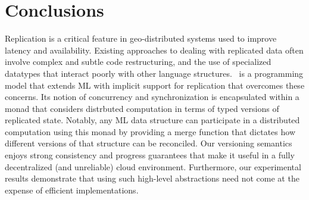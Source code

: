 \section{Conclusions}
\label{sec:conclusions}

Replication is a critical feature in geo-distributed systems used to
improve latency and availability.  Existing approaches to dealing with
replicated data often involve complex and subtle code restructuring,
and the use of specialized datatypes that interact poorly with other
language structures.  \name\ is a programming model that extends ML
with implicit support for replication that overcomes these concerns.
Its notion of concurrency and synchronization is encapsulated within a
monad that considers distrbuted computation in terms of typed versions
of replicated state.  Notably, any ML data structure can participate
in a distributed computation using this monad by providing a merge
function that dictates how different versions of that structure can be
reconciled.  Our versioning semantics enjoys strong consistency and
progress guarantees that make it useful in a fully decentralized (and
unreliable) cloud environment.  Furthermore, our experimental results
demonstrate that using such high-level abstractions need not come at
the expense of efficient implementations.
